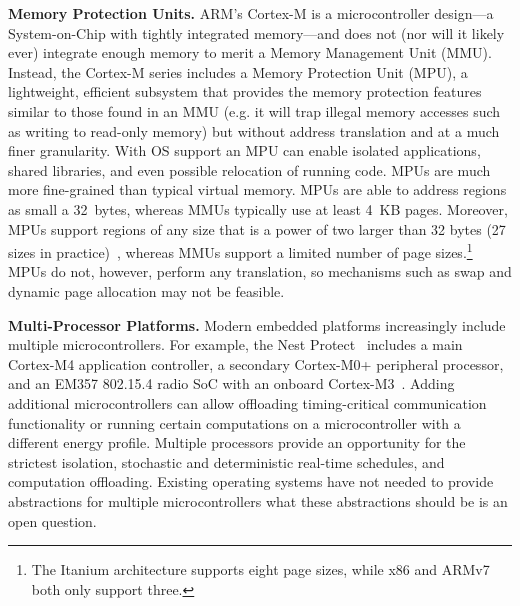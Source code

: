 {\bf Memory Protection Units.}
ARM's Cortex-M is a microcontroller design---a System-on-Chip with tightly
integrated memory---and does not (nor will it likely ever) integrate enough
memory to merit a Memory Management Unit (MMU). Instead, the Cortex-M series
includes a Memory Protection Unit (MPU), a lightweight, efficient subsystem
that provides the memory protection features similar to those found in an MMU
(e.g. it will trap illegal memory accesses such as writing to read-only memory)
but without address translation and at a much finer granularity.
With OS support an MPU can enable isolated applications, shared libraries, and
even possible relocation of running code.
MPUs are much more fine-grained than typical virtual memory. MPUs are able to
address regions as small a 32~bytes, whereas MMUs typically use at least 4~KB
pages. Moreover, MPUs support regions of any size that is a power of two larger
than 32 bytes (27 sizes in practice)~\cite{cortexm4-ug:ch4.5}, whereas MMUs
support a limited number of page sizes.\footnote{The Itanium architecture
supports eight page sizes, while x86 and ARMv7 both only support three.}
MPUs do not, however, perform any translation, so mechanisms such as swap and
dynamic page allocation may not be feasible.

{\bf Multi-Processor Platforms.}
Modern embedded platforms increasingly include multiple microcontrollers. For
example, the Nest Protect~\cite{nest-protect} includes a main Cortex-M4 application controller, a
secondary Cortex-M0+ peripheral processor, and an EM357 802.15.4 radio SoC with
an onboard Cortex-M3~\cite{nestprotect-teardown}. Adding additional
microcontrollers can allow offloading timing-critical communication
functionality or running certain computations on a microcontroller with a
different energy profile. Multiple processors provide an opportunity for the
strictest isolation, stochastic and deterministic real-time schedules, and
computation offloading.
Existing operating systems have not needed to provide abstractions for multiple
microcontrollers what these abstractions should be is an open question.



